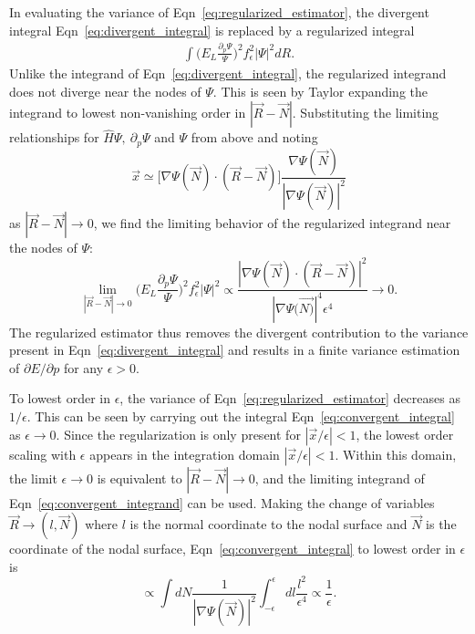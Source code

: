 \documentclass[twocolumn]{revtex4-1}
\begin{document}
In evaluating the variance of Eqn~\ref{eq:regularized_estimator}, the divergent integral Eqn~\ref{eq:divergent_integral} is replaced by a regularized integral
\begin{equation}
\begin{split}
\int \Big(E_L\frac{\partial_p\Psi}{\Psi}\Big)^2 f_\epsilon^2 |\Psi|^2 dR.
\end{split}
\label{eq:convergent_integral}
\end{equation}
Unlike the integrand of Eqn~\ref{eq:divergent_integral}, the regularized integrand does not diverge near the nodes of $\Psi$. 
This is seen by Taylor expanding the integrand to lowest non-vanishing order in $|\vec{R} - \vec{N}|$. 
Substituting the limiting relationships for $\hat{H}\Psi, \ \partial_p \Psi$ and $\Psi$ from above and noting 
\begin{equation}
   \vec{x} \simeq \Big[\nabla\Psi(\vec{N}) \cdot (\vec{R} - \vec{N}) \Big] \frac{\nabla \Psi(\vec{N})}{|\nabla \Psi(\vec{N})|^2}
\end{equation} 
 as $|\vec{R} - \vec{N}| \rightarrow 0$, we find the limiting behavior of the regularized integrand near the nodes of $\Psi$: 
\begin{equation}
\lim_{|\vec{R} - \vec{N}| \rightarrow 0 } \Big(E_L\frac{\partial_p\Psi}{\Psi}\Big)^2 f_\epsilon^2 |\Psi|^2 \propto \frac{|\nabla\Psi(\vec{N}) \cdot (\vec{R} - \vec{N})|^2}{|\nabla\Psi(\vec{N)}|^4 \epsilon^4}\rightarrow 0.
\label{eq:convergent_integrand}
\end{equation}
The regularized estimator thus removes the divergent contribution to the variance present in Eqn~\ref{eq:divergent_integral} and results in a finite variance estimation of $\partial E/\partial p$ for any $\epsilon > 0$.

To lowest order in $\epsilon$, the variance of Eqn~\ref{eq:regularized_estimator} decreases as $1/\epsilon$.
This can be seen by carrying out the integral Eqn~\ref{eq:convergent_integral} as $\epsilon\rightarrow 0 $. 
Since the regularization is only present for $|\vec{x}/\epsilon| < 1$, the lowest order scaling with $\epsilon$ appears in the integration domain $|\vec{x}/\epsilon| < 1$. 
Within this domain, the limit $\epsilon \rightarrow 0$ is equivalent to $|\vec{R} - \vec{N}| \rightarrow 0$, and the limiting integrand of Eqn~\ref{eq:convergent_integrand} can be used. 
Making the change of variables $\vec{R} \rightarrow (l, \vec{N})$ where $l$ is the normal coordinate to the nodal surface and $\vec{N}$ is the coordinate of the nodal surface, Eqn~\ref{eq:convergent_integral} to lowest order in $\epsilon$ is 
\begin{equation}
\propto \int dN \frac{1}{|\nabla\Psi(\vec{N})|^2} \int_{-\epsilon}^{\epsilon} dl \frac{l^2}{\epsilon^4} \propto \frac{1}{\epsilon}.
\end{equation}
\end{document}
